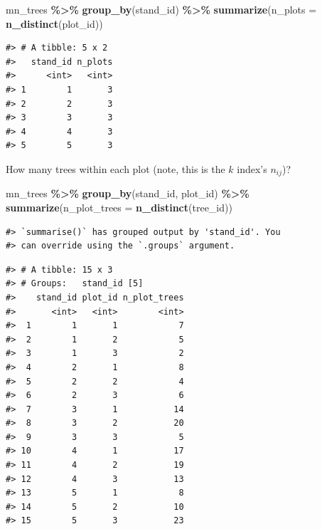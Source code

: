 \documentclass[
  11pt,
]{krantz}
\newenvironment{Shaded}{\begin{snugshade}}{\end{snugshade}}
\newcommand{\DataTypeTok}[1]{\textcolor[rgb]{0.13,0.29,0.53}{#1}}
\newcommand{\KeywordTok}[1]{\textcolor[rgb]{0.13,0.29,0.53}{\textbf{#1}}}
\newcommand{\NormalTok}[1]{#1}
\newcommand{\OperatorTok}[1]{\textcolor[rgb]{0.81,0.36,0.00}{\textbf{#1}}}
\newcommand{\StringTok}[1]{\textcolor[rgb]{0.31,0.60,0.02}{#1}}
\theoremstyle{definition}
\theoremstyle{definition}
\theoremstyle{definition}
\theoremstyle{definition}
\theoremstyle{remark}
\begin{document}
\begin{Shaded}
\begin{Highlighting}[]
\NormalTok{mn\_trees }\OperatorTok{\%\textgreater{}\%}\StringTok{ }\KeywordTok{group\_by}\NormalTok{(stand\_id) }\OperatorTok{\%\textgreater{}\%}\StringTok{ }
\StringTok{  }\KeywordTok{summarize}\NormalTok{(}\DataTypeTok{n\_plots =} \KeywordTok{n\_distinct}\NormalTok{(plot\_id))}
\end{Highlighting}
\end{Shaded}

\begin{verbatim}
#> # A tibble: 5 x 2
#>   stand_id n_plots
#>      <int>   <int>
#> 1        1       3
#> 2        2       3
#> 3        3       3
#> 4        4       3
#> 5        5       3
\end{verbatim}

How many trees within each plot (note, this is the \(k\) index's \(n_{ij}\))?

\begin{Shaded}
\begin{Highlighting}[]
\NormalTok{mn\_trees }\OperatorTok{\%\textgreater{}\%}\StringTok{ }\KeywordTok{group\_by}\NormalTok{(stand\_id, plot\_id) }\OperatorTok{\%\textgreater{}\%}\StringTok{ }
\StringTok{  }\KeywordTok{summarize}\NormalTok{(}\DataTypeTok{n\_plot\_trees =} \KeywordTok{n\_distinct}\NormalTok{(tree\_id))}
\end{Highlighting}
\end{Shaded}

\begin{verbatim}
#> `summarise()` has grouped output by 'stand_id'. You
#> can override using the `.groups` argument.
\end{verbatim}

\begin{verbatim}
#> # A tibble: 15 x 3
#> # Groups:   stand_id [5]
#>    stand_id plot_id n_plot_trees
#>       <int>   <int>        <int>
#>  1        1       1            7
#>  2        1       2            5
#>  3        1       3            2
#>  4        2       1            8
#>  5        2       2            4
#>  6        2       3            6
#>  7        3       1           14
#>  8        3       2           20
#>  9        3       3            5
#> 10        4       1           17
#> 11        4       2           19
#> 12        4       3           13
#> 13        5       1            8
#> 14        5       2           10
#> 15        5       3           23
\end{verbatim}
\end{document}
